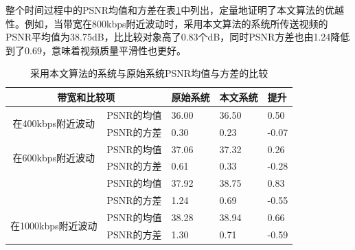 整个时间过程中的PSNR均值和方差在表\ref{tab:improvement-combined}中列出，定量地证明了本文算法的优越性。例如，当带宽在800kbps附近波动时，采用本文算法的系统所传送视频的PSNR平均值为38.75dB，比比较对象高了0.83个dB，同时PSNR方差也由1.24降低到了0.69，意味着视频质量平滑性也更好。

\begin{table}[!h]
	\centering
	\caption{采用本文算法的系统与原始系统PSNR均值与方差的比较}
	\label{tab:improvement-combined}
	\small
	\begin{minipage}{1.0\linewidth}
		\centering
		\begin{tabular}{c|c|*{2}{p{2.0cm}<{\centering}|}p{2.0cm}<{\centering}}
			\hline \hline
			\multicolumn{2}{c|}{带宽和比较项} &
			{原始系统} & {本文系统} & {提升} \\ \hline 
			\multirow{2}{*}{在400kbps附近波动}
			& PSNR的均值
			& 36.00 & 36.50 & 0.50 \\ \cline{2-5}
			& PSNR的方差
			& 0.30 & 0.23 & -0.07 \\ \hline
			\multirow{2}{*}{在600kbps附近波动}
			& PSNR的均值 & 37.06 & 37.32 & 0.26 \\ \cline{2-5}
			& PSNR的方差 & 0.61 & 0.33 & -0.28 \\ \Xhline{2\arrayrulewidth}
			\multirow{2}{*}{在800kbps附近波动}
			& PSNR的均值 & 37.92 & 38.75 & 0.83 \\ \cline{2-5}
			& PSNR的方差 & 1.24 & 0.69 & -0.55 \\ \hline
			\multirow{2}{*}{在1000kbps附近波动}
			& PSNR的均值 & 38.28 & 38.94 & 0.66 \\ \cline{2-5}
			& PSNR的方差 & 1.30 & 0.71 & -0.59 \\ \hline
		\end{tabular}
	\end{minipage}
\end{table}

